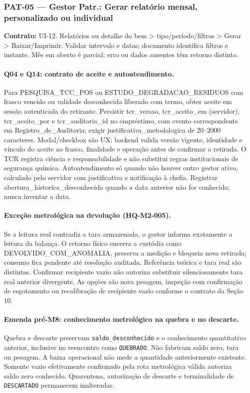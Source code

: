 \subsubsection{PAT-05 --- Gestor Patr.: Gerar relatório mensal, personalizado ou individual}
\textbf{Contrato:} UI-12. Relatórios ou detalhe do bem > tipo/período/filtros > Gerar > Baixar/Imprimir. Validar intervalo e datas; documento identifica filtros e instante. Mês em aberto é parcial; erro ou dados ausentes têm retorno distinto.

\paragraph{Q04 e Q14: contrato de aceite e autoatendimento.}
Para PESQUISA\_TCC\_POS ou ESTUDO\_DEGRADACAO\_RESIDUOS com frasco vencido ou validade desconhecida liberado com termo, obter aceite em sessão autenticada do retirante. Persistir tcr\_versao, tcr\_aceito\_em (servidor), tcr\_aceito\_por e tcr\_auditoria\_id no empréstimo, com evento correspondente em Registro\_de\_Auditoria; exigir justificativa\_metodologica de 20--2000 caracteres. Modal/checkbox são UX: backend valida versão vigente, identidade e vínculo do aceite ao frasco, finalidade e operação antes de confirmar a retirada. O TCR registra ciência e responsabilidade e não substitui regras institucionais de segurança química. Autoatendimento só quando não houver outro gestor ativo, calculado pelo servidor com justificativa e notificação à chefia. Registrar abertura\_historica\_desconhecida quando a data anterior não for conhecida; nunca inventar a data.


\paragraph{Exceção metrológica na devolução (HQ-M2-005).}
Se a leitura real contradiz a tara armazenada, o gestor informa exatamente a leitura da balança. O retorno físico encerra a custódia como DEVOLVIDO\_COM\_ANOMALIA, preserva a medição e bloqueia nova retirada; consumo fica pendente até resolução auditada. Referência teórica e tara real são distintas. Confirmar recipiente vazio não autoriza substituir silenciosamente tara real anterior divergente. As opções são nova pesagem, inspeção com confirmação de esgotamento ou recalibração de recipiente vazio conforme o contrato da Seção 10.

\paragraph{Emenda pré-M8: conhecimento metrológico na quebra e no descarte.}
Quebra e descarte preservam \texttt{saldo\_desconhecido} e o conhecimento quantitativo anterior, inclusive no reencontro como \texttt{QUEBRADO}. Não fabricam saldo zero, tara ou pesagem. A baixa operacional não mede a quantidade anteriormente existente. Somente vazio efetivamente confirmado pela rota metrológica válida autoriza saldo zero conhecido. Quarentena, autorização de descarte e terminalidade de \texttt{DESCARTADO} permanecem inalteradas.
